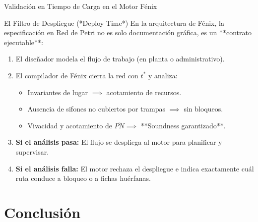 \documentclass[10pt, aspectratio=169]{beamer}
\begin{document}
\begin{frame}{Validación en Tiempo de Carga en el Motor Fénix}
	\begin{block}{El Filtro de Despliegue (*Deploy Time*)}
		En la arquitectura de Fénix, la especificación en Red de Petri no es solo documentación gráfica, es un **contrato ejecutable**:
		\begin{enumerate}
			\item El diseñador modela el flujo de trabajo (en planta o administrativo).
			\item El compilador de Fénix cierra la red con $t^*$ y analiza:
				\begin{itemize}
					\item Invariantes de lugar $\implies$ acotamiento de recursos.
					\item Ausencia de sifones no cubiertos por trampas $\implies$ sin bloqueos.
					\item Vivacidad y acotamiento de $\overline{PN} \implies$ **Soundness garantizado**.
				\end{itemize}
			\item \textbf{Si el análisis pasa:} El flujo se despliega al motor para planificar y supervisar.
			\item \textbf{Si el análisis falla:} El motor rechaza el despliegue e indica exactamente cuál ruta conduce a bloqueo o a fichas huérfanas.
		\end{enumerate}
	\end{block}
\end{frame}

\section{Conclusión}
\end{document}
